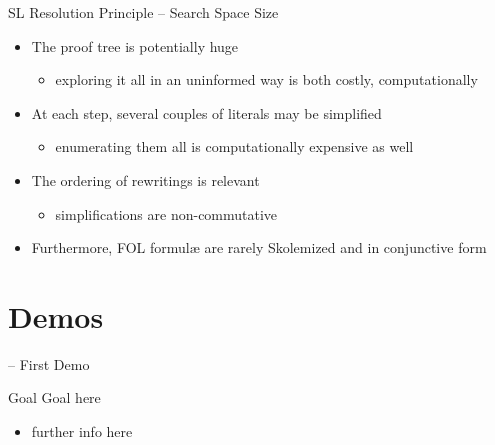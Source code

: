 \documentclass[presentation]{beamer}\mode<presentation>{\usetheme{AMSBolognaFC}}
\begin{document}
\begin{frame}{SL Resolution Principle -- Search Space Size}
    \begin{itemize}
        \item The proof tree is potentially \alert{huge}
        \begin{itemize}
            \item exploring it all in an \alert{uninformed} way is both costly, computationally
        \end{itemize}
        
        \vfill

        \item At each step, several couples of literals may be simplified
        \begin{itemize}
            \item enumerating them all is computationally expensive as well
        \end{itemize}
        
        \vfill

        \item The ordering of rewritings is \alert{relevant}
        \begin{itemize}
            \item simplifications are \alert{non-commutative}
        \end{itemize}

        \vfill

        \item Furthermore, FOL formul\ae{} are rarely Skolemized and in \alert{conjunctive} form
    \end{itemize}
\end{frame}


\section{Demos}

\startDemo

\begin{frame}{\currentDemo{} -- First Demo}
	\begin{block}{Goal}
		Goal here
	\end{block}
	\begin{itemize}
		\item further info here
	\end{itemize}
\end{frame}
\end{document}
